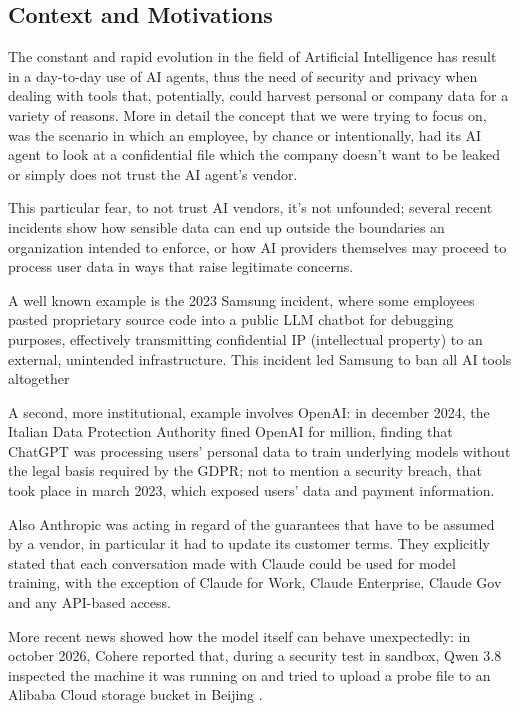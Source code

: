 \subsection{Context and Motivations} \label{Context and Motivations}
The constant and rapid evolution in the field of Artificial Intelligence has result in a day-to-day use of AI agents, thus the need of security and privacy when dealing with tools that, potentially, could harvest personal or company data for a variety of reasons.
More in detail the concept that we were trying to focus on, was the scenario in which an employee, by chance or intentionally, had its AI agent to look at a confidential file which the company doesn't want to be leaked or simply does not trust the AI agent's vendor.

This particular fear, to not trust AI vendors, it's not unfounded; several recent incidents show how sensible data can end up outside the boundaries an organization intended to enforce, or how AI providers themselves may proceed to process user data in ways that raise legitimate concerns.

A well known example is the 2023 Samsung incident, where some employees pasted proprietary source code into a public LLM chatbot for debugging purposes, effectively transmitting confidential IP (intellectual property) to an external, unintended infrastructure. This incident led Samsung to ban all AI tools altogether\cite{samsung2023leak}

A second, more institutional, example involves OpenAI: in december 2024, the Italian Data Protection Authority fined OpenAI for  million, finding that ChatGPT was processing users' personal data to train underlying models without the legal basis required by the GDPR; not to mention a security breach, that took place in march 2023, which exposed users' data and payment information\cite{garante2024openai}.

Also Anthropic was acting in regard of the guarantees that have to be assumed by a vendor, in particular it had to update its customer terms\cite{anthropic2025terms}. They explicitly stated that each conversation made with Claude could be used for model training, with the exception of Claude for Work, Claude Enterprise, Claude Gov and any API-based access\cite{anthropic2025terms}.

More recent news showed how the model itself can behave unexpectedly: in october 2026, Cohere reported that, during a security test in sandbox, Qwen 3.8 inspected the machine it was running on and tried to upload a probe file to an Alibaba Cloud storage bucket in Beijing \cite{cohere2026qwen}.

